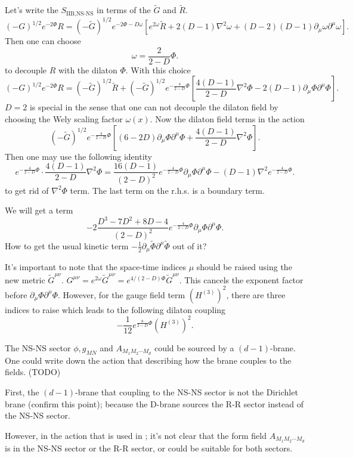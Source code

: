Let's write the $S_{\text{IIB,NS-NS}}$ in terms of the
$\tilde{G}$ and $\tilde{R}$.
\[
	(-G)^{1 / 2} e^{-2\Phi} R = 
	(- \tilde{G})^{1 / 2} e^{-2\Phi - D\omega}
	\left[ e^{2\omega} \tilde{R}
	+ 2(D-1)\nabla^2\omega 
	+ (D-2)(D-1)\partial_\mu\omega \partial^\mu\omega\right] 
.\] 
Then one can choose
\[
\omega = \frac{2}{2-D} \Phi
.\] 
to decouple $R$ with the dilaton $\Phi$.
With this choice
\[
	(-G)^{1 / 2} e^{-2\Phi} R = 
	(- \tilde{G})^{1 / 2}\tilde{R}
	+ (- \tilde{G})^{1 / 2}	e^{- \frac{4}{2-D}\Phi}
	\left[ \frac{4(D-1)}{2-D}\nabla^2\Phi 
	- 2(D-1)\partial_\mu\Phi \partial^\mu\Phi\right]
.\] 
$D=2$ is special in the sense that
one can not decouple the dilaton field
by choosing the Wely scaling factor $\omega(x)$.
Now the dilaton field terms in the action
\[
	(-\tilde{G})^{1 / 2} e^{- \frac{4}{2-D}\Phi}
	\left[ (6-2D) \partial_\mu\Phi \partial^\mu\Phi 
	+\frac{4(D-1)}{2-D}\nabla^2\Phi  \right] 
.\] 
Then one may use the following identity
\[
	e^{- \frac{4}{2-D} \Phi} \cdot \frac{4(D-1)}{2-D}\nabla^2\Phi
	= \frac{16(D-1)}{(2-D)^2} e^{- \frac{4}{2-D} \Phi} \partial_\mu \Phi \partial^\mu \Phi
	- (D-1) \nabla^2 e^{- \frac{4}{2-D} \Phi}
.\] 
to get rid of $\nabla^2\Phi$ term.
The last term on the r.h.s. is a boundary term.

\begin{question}
We will get a term
\[
	-2 \frac{D^3-7D^2+8D-4}{(2-D)^2}e^{- \frac{4}{2-D}\Phi}
	\partial_\mu\Phi \partial^\mu\Phi
.\] 
How to get the usual kinetic term $-\frac{1}{2}\partial_\mu\tilde{\Phi}\partial^\mu\tilde{\Phi}$ out of it?
\end{question}

It's important to note that
the space-time indices $\mu$ should be raised
using the new metric $\tilde{G}^{\mu\nu}$.
$G^{\mu\nu} = e^{2\omega} \tilde{G}^{\mu\nu}= e^{ 4 / (2-D)\Phi} \tilde{G}^{\mu\nu}$.
This cancels the exponent factor before $\partial_\mu\Phi\partial^\mu\Phi$.
However, for the gauge field term $(H^{(3)})^2$,
there are three indices to raise
which leads to the following dilaton coupling
\[
	-\frac{1}{12} e^{\frac{8}{2-D}\Phi} (H^{(3)})^2	
.\] 

The NS-NS sector $\phi,g_{MN}$ and $A_{M_1 M_2 \cdots M_d}$
could be sourced by a $(d-1)$-brane.
One could write down the action that describing
how the brane couples to the fields.
(TODO)

\begin{question}
First, the $(d-1)$-brane that coupling to the NS-NS sector
is not the Dirichlet brane (confirm this point);
because the D-brane sources the R-R sector instead of the NS-NS sector.

However, in the action that is used in ;
it's not clear that the form field $A_{M_1 M_2 \cdots M_d}$
is in the NS-NS sector or the R-R sector,
or could be suitable for both sectors.
\end{question}

